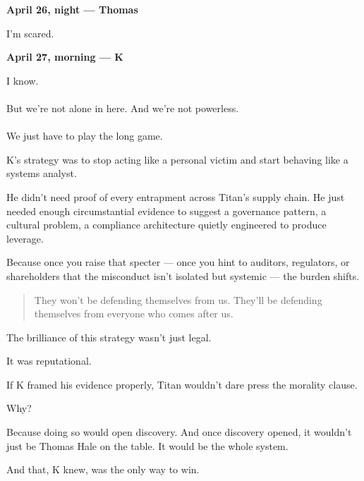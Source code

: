 \begin{JournalChat}
\vspace{1em}

\textbf{April 26, night — Thomas}
\begin{adjustwidth}{2em}{}
    I’m scared.
\end{adjustwidth}

\vspace{1em}

\textbf{April 27, morning — K}
\begin{adjustwidth}{2em}{}
    I know.
    \\\\
    But we’re not alone in here.  
    And we’re not powerless.
    \\\\
    We just have to play the long game.
\end{adjustwidth}

\end{JournalChat}


\medskip

K’s strategy was to stop acting like a personal victim
and start behaving like a systems analyst.

He didn’t need proof of every entrapment across Titan’s supply chain.
He just needed enough circumstantial evidence to suggest a governance pattern, a cultural problem,
a compliance architecture quietly engineered to produce leverage.

Because once you raise that specter --- 
once you hint to auditors, regulators, or shareholders that the misconduct isn’t isolated but systemic ---
the burden shifts.

\begin{quote}
They won’t be defending themselves from us.
They’ll be defending themselves from everyone who comes after us.
\end{quote}

The brilliance of this strategy wasn’t just legal.

It was reputational.

If K framed his evidence properly, Titan wouldn’t dare press the morality clause.

Why?

Because doing so would open discovery.
And once discovery opened, it wouldn’t just be Thomas Hale on the table.
It would be the whole system.

And that, K knew, was the only way to win.

\medskip

